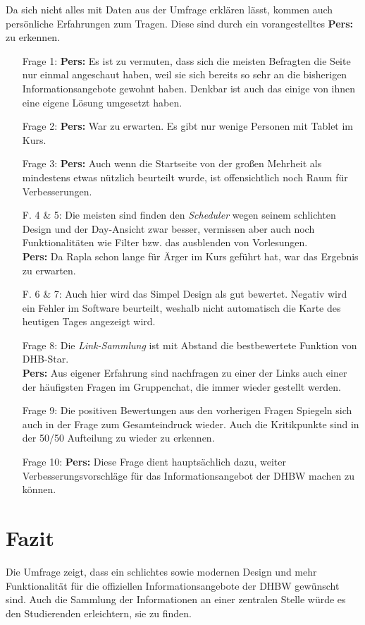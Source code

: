 Da sich nicht alles mit Daten aus der Umfrage erklären lässt, kommen auch persönliche Erfahrungen zum Tragen. Diese sind durch ein vorangestelltes \textbf{Pers:} zu erkennen. 

\begin{itemize}
\item[Frage 1:]
{\textbf{Pers:} Es ist zu vermuten, dass sich die meisten Befragten die Seite nur einmal angeschaut haben, weil sie sich bereits so sehr an die bisherigen Informationsangebote gewohnt haben. Denkbar ist auch das einige von ihnen eine eigene Lösung umgesetzt haben. }
\item[Frage 2:]
{\textbf{Pers:} War zu erwarten. Es gibt nur wenige Personen mit Tablet im Kurs. }
\item[Frage 3:]
{\textbf{Pers:} Auch wenn die Startseite von der großen Mehrheit als mindestens etwas nützlich beurteilt wurde, ist offensichtlich noch Raum für Verbesserungen.}
\item[F. 4 \& 5:]
{Die meisten sind finden den \emph{Scheduler} wegen seinem schlichten Design und der Day-Ansicht zwar besser, vermissen aber auch noch Funktionalitäten wie Filter bzw. das ausblenden von Vorlesungen. \\
	\textbf{Pers:} Da Rapla schon lange für Ärger im Kurs geführt hat, war das Ergebnis zu erwarten.}
\item[F. 6 \& 7:]
{Auch hier wird das Simpel Design als gut bewertet. Negativ wird ein Fehler im Software beurteilt, weshalb nicht automatisch die Karte des heutigen Tages angezeigt wird. }
\item [Frage 8:]
{Die \emph{Link-Sammlung} ist mit Abstand die bestbewertete Funktion von DHB-Star. \\
	\textbf{Pers:} Aus eigener Erfahrung sind nachfragen zu einer der Links auch einer der häufigsten Fragen im Gruppenchat, die immer wieder gestellt werden. }
\item [Frage 9:]
{Die positiven Bewertungen aus den vorherigen Fragen Spiegeln sich auch in der Frage zum Gesamteindruck wieder. Auch die Kritikpunkte sind in der 50/50 Aufteilung zu wieder zu erkennen. }
\item [Frage 10:]
{\textbf{Pers:} Diese Frage dient hauptsächlich dazu, weiter Verbesserungsvorschläge für das Informationsangebot der DHBW machen zu können. }
\end{itemize}

\section{Fazit}
Die Umfrage zeigt, dass ein schlichtes sowie modernen Design und mehr Funktionalität für die offiziellen Informationsangebote der DHBW gewünscht sind. Auch die Sammlung der Informationen an einer zentralen Stelle würde es den Studierenden erleichtern, sie zu finden.

